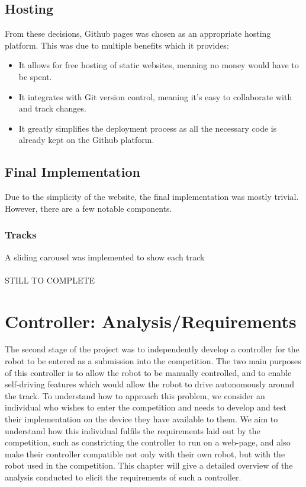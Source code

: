 \documentclass{l4proj}
\begin{document}
\section{Hosting}
From these decisions, Github pages was chosen as an appropriate hosting platform. This was due to multiple benefits which it provides:
\begin{itemize}
    \item It allows for free hosting of static websites, meaning no money would have to be spent.
    \item It integrates with Git version control, meaning it’s easy to collaborate with and track changes.
    \item It greatly simplifies the deployment process as all the necessary code is already kept on the Github platform.
\end{itemize}

\section{Final Implementation}
Due to the simplicity of the website, the final implementation was mostly trivial. However, there are a few notable components.

\subsection{Tracks}
A sliding carousel was implemented to show each track
\\\\
STILL TO COMPLETE


\chapter{Controller: Analysis/Requirements}
The second stage of the project was to independently develop a controller for the robot to be entered as a submission into the competition. The two main purposes of this controller is to allow the robot to be manually controlled, and to enable self-driving features which would allow the robot to drive autonomously around the track. To understand how to approach this problem, we consider an individual who wishes to enter the competition and needs to develop and test their implementation on the device they have available to them. We aim to understand how this individual fulfils the requirements laid out by the competition, such as constricting the controller to run on a web-page, and also make their controller compatible not only with their own robot, but with the robot used in the competition. This chapter will give a detailed overview of the analysis conducted to elicit the requirements of such a controller. 
\end{document}
